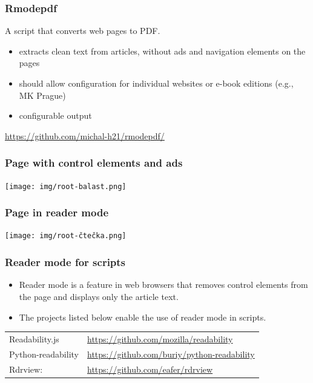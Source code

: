 \begin{frame}
  \frametitle{Rmodepdf}

  A script that converts  web pages to PDF.

  \begin{itemize}
    \item extracts clean text from articles, without ads and navigation elements on the pages
    \item should allow configuration for individual websites or e-book editions (e.g., MK Prague)
    \item configurable output
  \end{itemize}


  \url{https://github.com/michal-h21/rmodepdf/}
\end{frame}

\begin{frame}
  \frametitle{Page with control elements and ads}
  \begin{center}
    \texttt{[image: img/root-balast.png]}
  \end{center}
\end{frame}

\begin{frame}
  \frametitle{Page in reader mode}
  \begin{center}
    \texttt{[image: img/root-čtečka.png]}
  \end{center}
\end{frame}

\begin{frame}
  \frametitle{Reader mode for scripts}
  \begin{itemize}
    \item Reader mode is a feature in web browsers that removes control elements from the page and displays only the article text.
    \item The projects listed below enable the use of reader mode in scripts.
  \end{itemize}

  \bigskip

  \begin{tabular}{ll}
    Readability.js & \url{https://github.com/mozilla/readability}\\
    Python-readability & \url{https://github.com/buriy/python-readability}\\
    Rdrview: & \url{https://github.com/eafer/rdrview}\\
  \end{tabular}

\end{frame}

